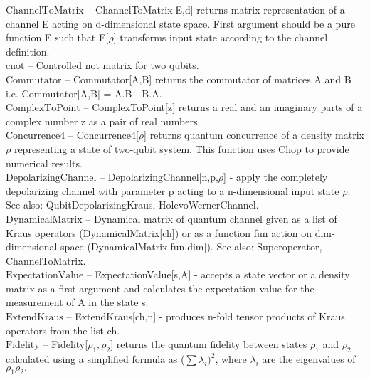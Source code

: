 \documentclass[a4paper,10pt]{scrartcl}
\begin{document}
\textbf{$ \text{ChannelToMatrix} $ }-- ChannelToMatrix[E,d] returns matrix representation of a channel E acting on d-dimensional state space. First argument should be a pure function E such that E[$\rho $] transforms input state according to the channel definition.$  $\\

\textbf{$ \text{cnot} $ }-- Controlled not matrix for two qubits.$  $\\

\textbf{$ \text{Commutator} $ }-- Commutator[A,B] returns the commutator of matrices A and B i.e. Commutator[A,B] = A.B - B.A.$  $\\

\textbf{$ \text{ComplexToPoint} $ }-- ComplexToPoint[z] returns a real and an imaginary parts of a complex number z as a pair of real numbers.$  $\\

\textbf{$ \text{Concurrence4} $ }-- Concurrence4[$\rho $] returns quantum concurrence of a density matrix $\rho $ representing a state of two-qubit system. This function uses Chop to provide numerical results.$  $\\

\textbf{$ \text{DepolarizingChannel} $ }-- DepolarizingChannel[n,p,$\rho $] - apply the completely depolarizing channel with parameter p acting to a n-dimensional input state $\rho $. See also: QubitDepolarizingKraus, HolevoWernerChannel.$  $\\

\textbf{$ \text{DynamicalMatrix} $ }-- Dynamical matrix of quantum channel given as a list of Kraus operators (DynamicalMatrix[ch]) or as a function fun action on dim-dimensional space (DynamicalMatrix[fun,dim]). See also: Superoperator, ChannelToMatrix.$  $\\

\textbf{$ \text{ExpectationValue} $ }-- ExpectationValue[s,A] - accepts a state vector or a density matrix as a first argument and calculates the expectation value for the measurement of A in the state s.$  $\\

\textbf{$ \text{ExtendKraus} $ }-- ExtendKraus[ch,n] - produces n-fold tensor products of Kraus operators from the list ch.$  $\\

\textbf{$ \text{Fidelity} $ }-- Fidelity[$ \rho _1,\rho _2 $] returns the quantum fidelity between states $ \rho _1 $ and $ \rho _2 $ calculated using a simplified formula as ($\sum $$ \lambda _i)^2 $, where $ \lambda _i $ are the eigenvalues of $ \rho _1\rho _2. $\\
\end{document}
